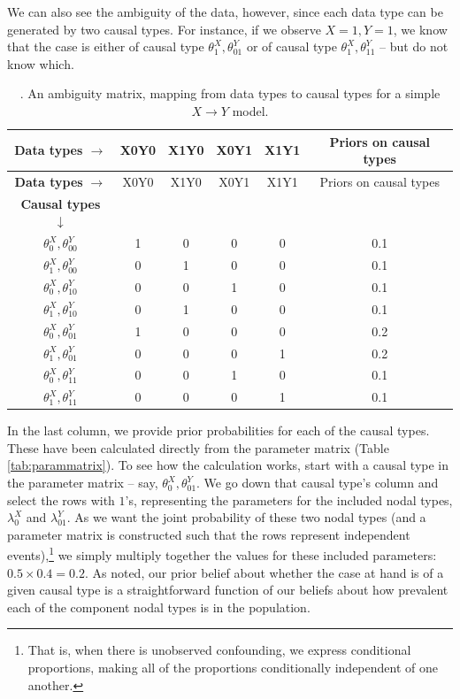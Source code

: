 \documentclass[12pt,]{book}
\let\rmarkdownfootnote\footnote%
\def\footnote{\protect\rmarkdownfootnote}
\begin{document}
We can also see the ambiguity of the data, however, since each data type can be generated by two causal types. For instance, if we observe \(X=1, Y=1\), we know that the case is either of causal type \(\theta^X_1,\theta^Y_{01}\) or of causal type \(\theta^X_1,\theta^Y_{11}\) -- but do not know which.

\begin{longtable}[]{@{}cccccc@{}}
\caption{\label{tab:ambigmatrix}. An ambiguity matrix, mapping from data types to causal types for a simple \(X \rightarrow Y\) model.}\tabularnewline
\toprule
\textbf{Data types} \(\rightarrow\) & X0Y0 & X1Y0 & X0Y1 & X1Y1 & Priors on causal types\tabularnewline
\midrule
\endfirsthead
\toprule
\textbf{Data types} \(\rightarrow\) & X0Y0 & X1Y0 & X0Y1 & X1Y1 & Priors on causal types\tabularnewline
\midrule
\endhead
\textbf{Causal types} \(\downarrow\) & & & & &\tabularnewline
\(\theta^X_0,\theta^Y_{00}\) & 1 & 0 & 0 & 0 & 0.1\tabularnewline
\(\theta^X_1,\theta^Y_{00}\) & 0 & 1 & 0 & 0 & 0.1\tabularnewline
\(\theta^X_0,\theta^Y_{10}\) & 0 & 0 & 1 & 0 & 0.1\tabularnewline
\(\theta^X_1,\theta^Y_{10}\) & 0 & 1 & 0 & 0 & 0.1\tabularnewline
\(\theta^X_0,\theta^Y_{01}\) & 1 & 0 & 0 & 0 & 0.2\tabularnewline
\(\theta^X_1,\theta^Y_{01}\) & 0 & 0 & 0 & 1 & 0.2\tabularnewline
\(\theta^X_0,\theta^Y_{11}\) & 0 & 0 & 1 & 0 & 0.1\tabularnewline
\(\theta^X_1,\theta^Y_{11}\) & 0 & 0 & 0 & 1 & 0.1\tabularnewline
\bottomrule
\end{longtable}

In the last column, we provide prior probabilities for each of the causal types. These have been calculated directly from the parameter matrix (Table \ref{tab:parammatrix}). To see how the calculation works, start with a causal type in the parameter matrix -- say, \(\theta^X_0,\theta^Y_{01}\). We go down that causal type's column and select the rows with \(1\)'s, representing the parameters for the included nodal types, \(\lambda^X_0\) and \(\lambda^Y_{01}\). As we want the joint probability of these two nodal types (and a parameter matrix is constructed such that the rows represent independent events),\footnote{That is, when there is unobserved confounding, we express conditional proportions, making all of the proportions conditionally independent of one another.} we simply multiply together the values for these included parameters: \(0.5 \times 0.4 = 0.2\). As noted, our prior belief about whether the case at hand is of a given causal type is a straightforward function of our beliefs about how prevalent each of the component nodal types is in the population.
\end{document}
